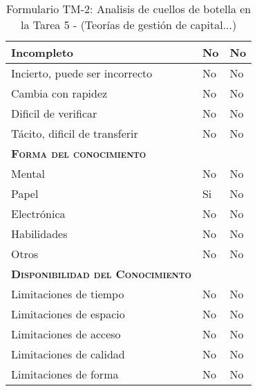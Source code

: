 \begin{table}[H]
{\begin{tabular}{|l|l|l|}
		Incompleto & \multicolumn{1}{p{1.0cm}|}{No} & \multicolumn{1}{p{13.0cm}|}{No}\\
		\hline

		Incierto, puede ser incorrecto & \multicolumn{1}{p{1.0cm}|}{No} & \multicolumn{1}{p{13.0cm}|}{No}\\
		\hline

		Cambia con rapidez & \multicolumn{1}{p{1.0cm}|}{No} & \multicolumn{1}{p{13.0cm}|}{No}\\
		\hline

		Dificil de verificar & \multicolumn{1}{p{1.0cm}|}{No} & \multicolumn{1}{p{13.0cm}|}{No}\\
		\hline

		Tácito, dificil de transferir& \multicolumn{1}{p{1.0cm}|}{No} & \multicolumn{1}{p{13.0cm}|}{No}\\
		\hline

		\textsc {\textbf{Forma del conocimiento}}& \multicolumn{1}{p{1.0cm}|}{} & \multicolumn{1}{p{13.0cm}|}{}\\
		\hline

		Mental & \multicolumn{1}{p{1.0cm}|}{No} & \multicolumn{1}{p{13.0cm}|}{No}\\
		\hline

		Papel & \multicolumn{1}{p{1.0cm}|}{Si} & \multicolumn{1}{p{13.0cm}|}{No}\\
		\hline

		Electrónica & \multicolumn{1}{p{1.0cm}|}{No} & \multicolumn{1}{p{13.0cm}|}{No}\\
		\hline

		Habilidades & \multicolumn{1}{p{1.0cm}|}{No} & \multicolumn{1}{p{13.0cm}|}{No}\\
		\hline

		Otros & \multicolumn{1}{p{1.0cm}|}{No} & \multicolumn{1}{p{13.0cm}|}{No}\\
		\hline

		\textsc {\textbf{Disponibilidad del Conocimiento}} & \multicolumn{1}{p{1.0cm}|}{} & \multicolumn{1}{p{13.0cm}|}{}\\
		\hline
		Limitaciones de tiempo& \multicolumn{1}{p{1.0cm}|}{No} & \multicolumn{1}{p{13.0cm}|}{No}\\
		\hline

		Limitaciones de espacio& \multicolumn{1}{p{1.0cm}|}{No} & \multicolumn{1}{p{13.0cm}|}{No}\\
		\hline

		Limitaciones de acceso& \multicolumn{1}{p{1.0cm}|}{No} & \multicolumn{1}{p{13.0cm}|}{No}\\
		\hline

		Limitaciones de calidad& \multicolumn{1}{p{1.0cm}|}{No} & \multicolumn{1}{p{13.0cm}|}{No}\\
		\hline

		Limitaciones de forma& \multicolumn{1}{p{1.0cm}|}{No} & \multicolumn{1}{p{13.0cm}|}{No}\\
		\hline

	  \end{tabular}
	}
	\caption{\label{tab:TM22}Formulario TM-2: Analisis de cuellos de botella en la Tarea 5 - (Teorías de gestión de capital...)}
  \end{table}

